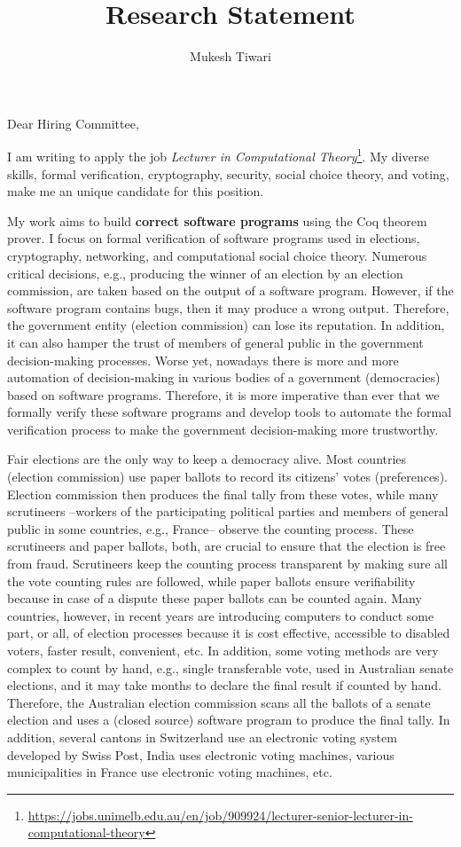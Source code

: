 \documentclass[a4paper]{article}
\title{Research Statement}
\author{Mukesh Tiwari}
\date{}
\begin{document}
\fontsize{12}{15}
\selectfont
\maketitle

Dear Hiring Committee, 

I am writing to apply the job \textit{Lecturer in Computational 
Theory}\footnote{\url{https://jobs.unimelb.edu.au/en/job/909924/lecturer-senior-lecturer-in-computational-theory}}. My diverse skills, 
formal verification, cryptography, security,
social choice theory, and voting, make me an unique candidate for this position.  

My work aims to build \textbf{correct software programs} 
using the Coq theorem prover. 
I focus on formal verification of software programs used in elections, cryptography, 
networking, and computational social choice theory. Numerous critical decisions, e.g., 
producing the winner of an election by an election commission,
are taken based on the output of a software program. However, if the
software program contains bugs, then it may produce a wrong 
output. Therefore, the government entity (election commission) can 
lose its reputation. In addition, it can also hamper the trust of  
members of general public in the government decision-making processes.
Worse yet, nowadays there is more and more automation of decision-making 
in various bodies of a government (democracies) based on software programs.
Therefore, it is more imperative than ever  that  we formally verify these software programs and 
develop tools to automate the formal verification process to make the 
government decision-making more trustworthy. 

Fair elections are the only way to keep a democracy alive. Most countries (election commission) use paper ballots to record 
its citizens' votes (preferences). Election commission then produces the final tally from these votes, 
while many scrutineers --workers of the participating political parties and members of general 
public in some countries, e.g., France-- observe the counting process. 
These scrutineers and paper ballots, both, are crucial to ensure that 
the election is free from fraud. Scrutineers keep the counting process transparent by making sure all the vote counting 
rules are followed, while paper ballots ensure verifiability because in case of a dispute these paper ballots 
can be counted again. Many countries, however, in recent years are introducing computers to conduct some part, or all, of 
election processes because it is cost effective, accessible to disabled voters, faster result, convenient, etc. 
In addition, some voting methods are very complex to count by hand, e.g., 
single transferable vote, used in Australian senate elections, and it may take months to declare the final result if 
counted by hand. Therefore, the Australian election commission scans all the ballots of a senate election and 
uses a (closed source) software program to produce the final tally. In addition, several cantons in Switzerland use an electronic 
voting system developed by Swiss Post, India uses electronic voting machines, various municipalities in France 
use electronic voting machines, etc.
\end{document}
